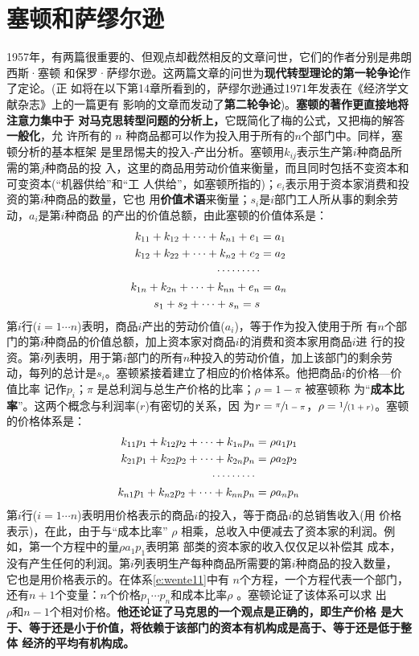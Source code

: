 \section{塞顿和萨缪尔逊}

1957年，有两篇很重要的、但观点却截然相反的文章问世，它们的作者分别是弗朗西斯·塞顿
和保罗·萨缪尔逊。这两篇文章的问世为\textbf{现代转型理论的第一轮争论}作了定论。(正
如将在以下第14章所看到的，萨缪尔逊通过1971年发表在《经济学文献杂志》上的一篇更有
影响的文章而发动了\textbf{第二轮争论})。\textbf{塞顿的著作更直接地将注意力集中于
  对马克思转型问题的分析上，}它既简化了梅的公式，又把梅的解答\textbf{一般化}，允
许所有的 $n$ 种商品都可以作为投入用于所有的$n$个部门中。同样，塞顿分析的基本框架
是里昂惕夫的投入-产出分析。塞顿用$k_{ij}$表示生产第$i$种商品所需的第$j$种商品的投
入，这里的商品用劳动价值来衡量，而且同时包括不变资本和可变资本(“机器供给”和“工
人供给”，如塞顿所指的)；$e_i$表示用于资本家消费和投资的第$i$种商品的数量，它也
用\textbf{价值术语}来衡量；$s_i$是$i$部门工人所从事的剩余劳动，$a_i$是第$i$种商品
的产出的价值总额，由此塞顿的价值体系是：
\begin{align}
k_{11}+k_{12}+ \cdots + k_{n1}+e_1 &=a_1 \label{e:wente10} \\
k_{12}+k_{22}+ \cdots + k_{n2}+e_2 &=a_2  \notag \\
  \cdots \cdots \cdots \notag \\
k_{1n}+k_{2n}+ \cdots + k_{nn}+e_n &=a_n \notag \\
s_1+s_2+ \cdots + s_n=s  \notag
\end{align}
第$i$行($i=1 \cdots n$)表明，商品$i$产出的劳动价值($a_i$)，等于作为投入使用于所
有$n$个部门的第$i$种商品的价值总额，加上资本家对商品$i$的消费和资本家用商品$i$进
行的投资。第$i$列表明，用于第$i$部门的所有$n$种投入的劳动价值，加上该部门的剩余劳
动，每列的总计是$s_i$。塞顿紧接着建立了相应的价格体系。他把商品$i$的价格—价值比率
记作$p_i$；$\pi$ 是总利润与总生产价格的比率；$\rho =1- \pi$ 被塞顿称
为“\textbf{成本比率}”。这两个概念与利润率($r$)有密切的关系，因
为$r=\sfrac{\pi}{1-\pi}$，$\rho =\sfrac{1}{(1+r)}$。塞顿的价格体系是：
\begin{align}
k_{11}p_1+k_{12}p_2+ \cdots + k_{1n}p_n&=\rho a_1p_1  \label{e:wente11}\\
k_{21}p_1+k_{22}p_2+ \cdots + k_{2n}p_n&=\rho a_2p_2 \notag \\
\cdots \cdots \cdots \notag \\
k_{n1}p_1+k_{n2}p_2+ \cdots + k_{nn}p_n&=\rho a_np_n \notag
\end{align}
第$i$行($i=1 \cdots n$)表明用价格表示的商品$i$的投入，等于商品$i$的总销售收入(用
价格表示)，在此，由于与“成本比率” $\rho$ 相乘，总收入中便减去了资本家的利润。例
如，第一个方程中的量$\rho a_1p_1$表明第 部类的资本家的收入仅仅足以补偿其
成本，没有产生任何的利润。第$i$列表明生产每种商品所需要的第$i$种商品的投入数量，
它也是用价格表示的。在体系\eqref{e:wente11}中有 $n$个方程，一个方程代表一个部门，
还有$n+1$个变量：$n个价格p_1 \cdots p_n$和成本比率$\rho$ 。塞顿论证了该体系可以求
出$\rho 和n-1$个相对价格。\textbf{他还论证了马克思的一个观点是正确的，即生产价格
  是大于、等于还是小于价值，将依赖于该部门的资本有机构成是高于、等于还是低于整体
  经济的平均有机构成。}

